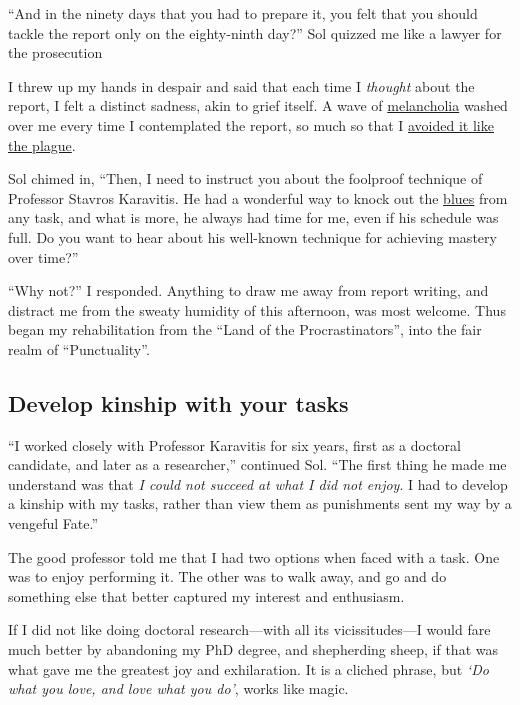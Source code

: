 \documentclass[
  a4paper,
]{article}
\begin{document}
``And in the ninety days that you had to prepare it, you felt that you
should tackle the report only on the eighty-ninth day?'' Sol quizzed me
like a lawyer for the prosecution

I threw up my hands in despair and said that each time I \emph{thought}
about the report, I felt a distinct sadness, akin to grief itself. A
wave of
\href{https://dictionary.cambridge.org/dictionary/english/melancholia}{melancholia}
washed over me every time I contemplated the report, so much so that I
\href{https://www.merriam-webster.com/words-at-play/avoid-like-the-plague-origin}{avoided
it like the plague}.

Sol chimed in, ``Then, I need to instruct you about the foolproof
technique of Professor Stavros Karavitis. He had a wonderful way to
knock out the \href{https://www.vocabulary.com/dictionary/blues}{blues}
from any task, and what is more, he always had time for me, even if his
schedule was full. Do you want to hear about his well-known technique
for achieving mastery over time?''

``Why not?'' I responded. Anything to draw me away from report writing,
and distract me from the sweaty humidity of this afternoon, was most
welcome. Thus began my rehabilitation from the ``Land of the
Procrastinators'', into the fair realm of ``Punctuality''.

\hypertarget{develop-kinship-with-your-tasks}{%
\subsection{Develop kinship with your
tasks}\label{develop-kinship-with-your-tasks}}

``I worked closely with Professor Karavitis for six years, first as a
doctoral candidate, and later as a researcher,'' continued Sol. ``The
first thing he made me understand was that \emph{I could not succeed at
what I did not enjoy}. I had to develop a kinship with my tasks, rather
than view them as punishments sent my way by a vengeful Fate.''

The good professor told me that I had two options when faced with a
task. One was to enjoy performing it. The other was to walk away, and go
and do something else that better captured my interest and enthusiasm.

If I did not like doing doctoral research---with all its
vicissitudes---I would fare much better by abandoning my PhD degree, and
shepherding sheep, if that was what gave me the greatest joy and
exhilaration. It is a cliched phrase, but \emph{`Do what you love, and
love what you do'}, works like magic.
\end{document}
